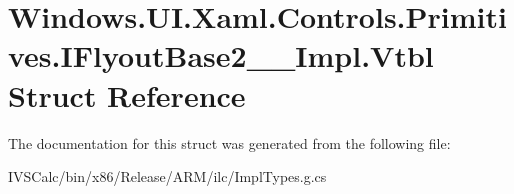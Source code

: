 \hypertarget{struct_windows_1_1_u_i_1_1_xaml_1_1_controls_1_1_primitives_1_1_i_flyout_base2_____impl_1_1_vtbl}{}\section{Windows.\+U\+I.\+Xaml.\+Controls.\+Primitives.\+I\+Flyout\+Base2\+\_\+\+\_\+\+Impl.\+Vtbl Struct Reference}
\label{struct_windows_1_1_u_i_1_1_xaml_1_1_controls_1_1_primitives_1_1_i_flyout_base2_____impl_1_1_vtbl}


The documentation for this struct was generated from the following file\+:\begin{DoxyCompactItemize}
\item 
I\+V\+S\+Calc/bin/x86/\+Release/\+A\+R\+M/ilc/Impl\+Types.\+g.\+cs\end{DoxyCompactItemize}
